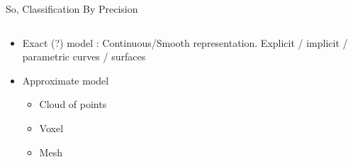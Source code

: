 \begin{frame}[fragile]{So, Classification By Precision}
 \begin{columns}
  \begin{column}{0.55\linewidth}
\begin{itemize}
\item Exact (?) model : Continuous/Smooth representation. Explicit / implicit / parametric curves / surfaces
\item Approximate model
	\begin{itemize}
	\item Cloud of points 

	\item Voxel

	\item Mesh


\end{itemize}
\end{itemize}
\end{column}
\end{columns}
\end{frame}
